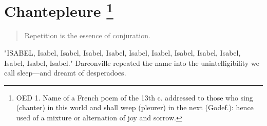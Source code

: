 
\chapter[Chantepleure] 
{ 
\Large{Chantepleure}
\footnote{
OED 1. Name of a French poem of the 13th c. addressed to those who sing (chanter) in this world and shall weep (pleurer) in the next (Godef.): hence used of a mixture or alternation of joy and sorrow. 
}
}

\begin{quotation}
  Repetition is the essence of conjuration.
\end{quotation} 
\vspace{0.2cm}
 
  "ISABEL, Isabel, Isabel, Isabel, Isabel, Isabel, Isabel, Isabel, Isabel,
Isabel, Isabel, Isabel, Isabel." Darconville repeated the name into the
unintelligibility we call sleep—and dreamt of desperadoes.
 



